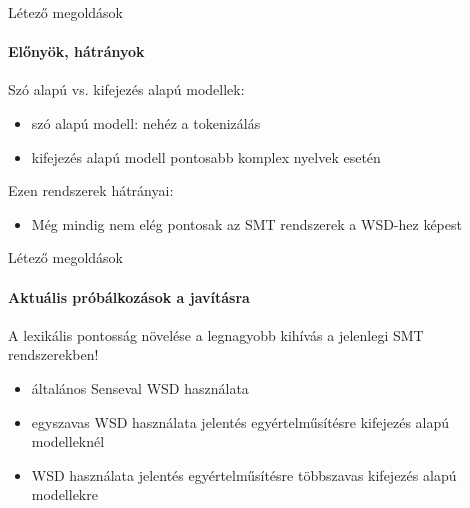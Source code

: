 \begin{frame}{Létező megoldások}
	\framesubtitle{Előnyök, hátrányok}
	
	Szó alapú vs. kifejezés alapú modellek: 
	\begin{itemize}
		\item
			szó alapú modell: nehéz a tokenizálás \cite{Lopez07asurvey}
		\item
			kifejezés alapú modell pontosabb komplex nyelvek esetén \cite{Lopez07asurvey}
		
	\end{itemize}
	
	Ezen rendszerek hátrányai:
	\begin{itemize}
		\item
			Még mindig nem elég pontosak az SMT rendszerek a WSD-hez képest \cite{Carpuat_evaluatingthe}
	\end{itemize}
	
\end{frame}


\begin{frame}{Létező megoldások}
	\framesubtitle{Aktuális próbálkozások a javításra}
		
		A lexikális pontosság növelése a legnagyobb kihívás a jelenlegi SMT rendszerekben!
		
	\begin{itemize}
		\item
			általános Senseval WSD használata \cite{carpuat2005}
		\item
			egyszavas WSD használata jelentés egyértelműsítésre kifejezés alapú modelleknél \cite{Carpuat06towardintegrating}
		\item
			WSD használata jelentés egyértelműsítésre többszavas kifejezés alapú modellekre \cite{Carpuat07improvingstatistical}
		
	\end{itemize}
\end{frame}


